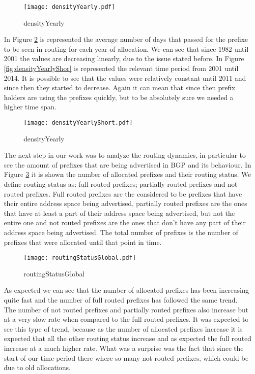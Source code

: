 \documentclass[11pt,a4paper]{scrreprt}
\begin{document}
\begin{figure}[ht!]
\centering
\texttt{[image: densityYearly.pdf]}
\caption{densityYearly}
\label{fig:densityYearly}
\end{figure}

In Figure \ref{fig:densityYearly} is represented the average number of days that passed for the prefixe to be seen in routing for each year of allocation. We can see that since 1982 until 2001 the values are decreasing linearly, due to the issue stated before. In  Figure \ref{fig:densityYearlyShor} is represented the relevant time period from 2001 until 2014. It is possible to see that the values were relatively constant until 2011 and since then they started to decrease. Again it can mean that since then prefix holders are using the prefixes quickly, but to be absolutely sure we needed a higher time span.


\begin{figure}[ht!]
\centering
\texttt{[image: densityYearlyShort.pdf]}
\caption{densityYearly}
\label{fig:densityYearly}
\end{figure}

The next step in our work was to analyze the routing dynamics, in particular to see the amount of prefixes that are being advertised in BGP and its behaviour. 
In Figure \ref{fig:routingStatusGlobal} it is shown the number of allocated prefixes and their routing status. We define routing status as: full routed prefixes; partially routed prefixes and not routed prefixes. Full routed prefixes are the considered to be prefixes that have their entire address space being advertised, partially routed prefixes are the ones that have at least a part of their address space being advertised, but not the entire one and not routed prefixes are the ones that don't have any part of their address space being advertised. The total number of prefixes is the number of prefixes that were allocated until that point in time.

\begin{figure}[ht!]
\centering
\texttt{[image: routingStatusGlobal.pdf]}
\caption{routingStatusGlobal}
\label{fig:routingStatusGlobal}
\end{figure}

As expected we can see that the number of allocated prefixes has been increasing quite fast and the number of full routed prefixes has followed the same trend. The number of not routed prefixes and partially routed prefixes also increase but at a very slow rate when compared to the full routed prefixes. It was expected to see this type of trend, because as the number of allocated prefixes increase it is expected that all the other routing status increase and as expected the full routed increase at a much higher rate. What was a surprise was the fact that since the start of our time period there where so many not routed prefixes, which could be due to old allocations.
\end{document}
